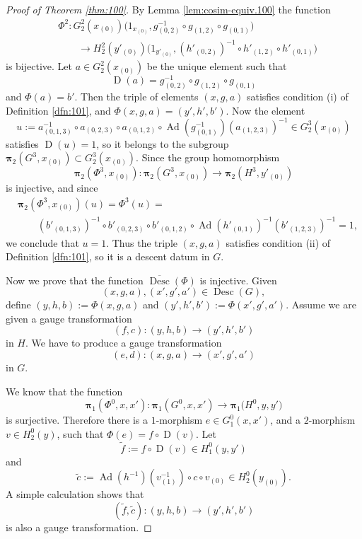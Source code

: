 \documentclass[a4paper,10pt]{amsart}
\theoremstyle{definition}
\numberwithin{equation}{section}
\newcommand{\opn}{\operatorname}
\newcommand{\ol}{\overline}
\newcommand{\tup}[1]{\textup{#1}}
\newcommand{\bsym}[1]{\boldsymbol{#1}}
\newcommand{\til}[1]{\tilde{#1}}
\begin{document}
\begin{proof}[Proof of Theorem \tup{\ref{thm:100}}]
By Lemma \ref{lem:cosim-equiv.100} the function
\[ \begin{aligned}
& \Phi^2 : G^2_2 (x_{(0)})
\bigl( 1_{x_{(0)}}, g_{(0, 2)}^{-1} \circ g_{(1, 2)} \circ g_{(0, 1)}
\bigr) \\
& \qquad \to 
H^2_2 (y'_{(0)})
\bigl( 1_{y'_{(0)}}, (h'_{(0, 2)})^{-1} \circ h'_{(1, 2)} 
\circ h'_{(0, 1)} \bigr)
\end{aligned} \]
is bijective. Let $a \in G^2_2 (x_{(0)})$
be the unique element such that 
\[ \opn{D}(a) = g_{(0, 2)}^{-1} \circ g_{(1, 2)} \circ g_{(0, 1)} \]
and $\Phi(a) = b'$. Then the triple of elements 
$(x, g, a)$ satisfies condition (i) of Definition \ref{dfn:101}, and 
$\Phi(x, g, a) = (y', h', b')$. 
Now the element 
\[ u := a_{(0, 1, 3)}^{-1} \circ a_{(0, 2, 3)} \circ 
a_{(0, 1, 2)} \circ \opn{Ad}(g_{(0, 1)}^{-1})(a_{(1, 2, 3)})^{-1} 
\in G^3_2(x_{(0)}) \]
satisfies $\opn{D}(u) = 1$, so it belongs to the subgroup 
$\bsym{\bsym{\pi}}_2(G^3, x_{(0)}) \subset G^3_2(x_{(0)})$.
Since the group homomorphism 
\[ \bsym{\bsym{\pi}}_2(\Phi^3, x_{(0)}) : \bsym{\bsym{\pi}}_2(G^3, x_{(0)}) \to 
\bsym{\pi}_2(H^3, y'_{(0)}) \]
is injective, and since 
\[ \begin{aligned}
& \bsym{\pi}_2(\Phi^3, x_{(0)})(u) = \Phi^3(u) =
\\
& \qquad  
(b'_{(0, 1, 3)})^{-1} \circ b'_{(0, 2, 3)} \circ 
b'_{(0, 1, 2)} \circ \opn{Ad}(h'_{(0, 1)})^{-1}(b'_{(1, 2, 3)})^{-1} = 1 ,
\end{aligned} \]
we conclude that $u = 1$. Thus the triple $(x, g, a)$ satisfies 
condition (ii) of Definition \ref{dfn:101}, so it is a descent datum in 
$G$. 

Now we prove that the function $\ol{\opn{Desc}}(\Phi)$ is
injective. Given 
\[ (x, g, a), (x', g', a') \in \opn{Desc}(G) , \]
define
$(y, h, b) := \Phi(x, g, a)$ and $(y', h', b') := \Phi(x', g', a')$. Assume we
are given a gauge transformation 
\[ (f, c) :  (y, h, b) \to (y', h', b') \]
in $H$. We have to produce a gauge transformation 
\[ (e, d) :  (x, g, a) \to (x', g', a') \]
in $G$.

We know that the function 
\[ \bsym{\pi}_1(\Phi^0, x, x') : 
\bsym{\pi}_1(G^0, x, x') \to
\bsym{\pi}_1 \bigl( H^0, y, y' \bigr) \]
is surjective. Therefore there is a $1$-morphism 
$e \in G^0_1(x, x')$, and a $2$-morphism 
$v \in H^0_2(y)$, 
such that 
$\Phi(e) = f \circ \opn{D}(v)$. 
Let 
\[ \til{f} := f \circ \opn{D}(v) \in H^0_1(y, y') \]
and
\[ \til{c} := \opn{Ad}(h^{-1})(v_{(1)}^{-1}) \circ c \circ v_{(0)} \in 
H^0_2(y_{(0)}) . \]
A simple calculation shows that 
\[ (\til{f}, \til{c}) :  (y, h, b) \to (y', h', b') \]
is also a gauge transformation. 


\end{proof}
\end{document}
